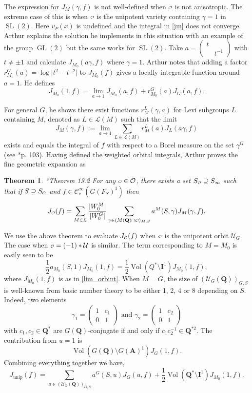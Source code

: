 \documentclass[11pt]{amsart}
\def\A{\mathbf A}
\def\I{\mathbf I}
\def\Q{\mathbf Q}
\def\CCC{\mathcal C}
\def\LLL{\mathcal L}
\def\O{\mathcal O}
\def\o{\scalebox{0.8}{$\scriptstyle\mathcal{O}$}}
\def\UUU{\mathcal U}
\def\cb#1{{\color{blue}#1}}
\def\bs{\setminus} 			%
\def\gl{\operatorname{GL}}
\def\mod#1{\lvert #1 \rvert} %
\def\sl{\operatorname{SL}}
\def\vol{\operatorname{Vol}}
\newtheorem{theorem}{Theorem}[section]
\theoremstyle{remark}
\begin{document}
The expression for $J_M(\gamma, f)$ is not well-defined when $\o$ is not anisotropic. The extreme case of this is when $\o$ is the unipotent variety containing $\gamma = 1$ in $\sl(2)$. Here $v_P(x)$ is undefined and the integral in \cref{jm} does not converge. Arthur explains the solution he implements in this situation with an example of the group $\gl(2)$ but the same works for $\sl(2)$. \cb{Take $a = \begin{pmatrix} t & \\ & t^{-1} \end{pmatrix}$ with $t \neq \pm 1$ and calculate $J_{M_0}(a\gamma, f)$ where $\gamma = 1$. Arthur notes that adding a factor $r_{M_0}^G(a) = \log \mod{t^2 - t^{-2}}$ to $J_{M_0}(f)$ gives a locally integrable function around $a=1$. He defines
\begin{equation} \label{lim_orbint}
	J_{M_0}(1, f) = \lim_{a \to 1} J_{M_0}(a, f) + r_{M_0}^G(a) J_G(a, f).
\end{equation}
}

For general $G$, he shows there exist functions $r_M^L(\gamma, a)$ for Levi subgroups $L$ containing $M$, denoted as $L \in \LLL(M)$ such that the limit
\[ J_M(\gamma, f) := \lim_{a \to 1} \sum_{L \in \LLL(M)} r_M^L(a) J_L(a\gamma, f) \]
exists and equals the integral of $f$ with respect to a Borel measure on the set $\gamma^G$ (see \cite{clay}*{p. 103}). Having defined the weighted orbital integrals, Arthur proves the fine geometric expansion as
\begin{theorem} \cite{clay}*{Theorem 19.2}
	For any $\o \in \O$, there exists a set $S_{\o} \supseteq S_\infty$ such that if $S \supseteq S_{\o}$ and $f \in \CCC_c^\infty(G(F_S)^1)$ then
	\[ J_{\o}(f) = \sum_{M \in \LLL} \frac{\mod{W_0^M}}{\mod{W_0^G}} \sum_{\gamma \in (M(\Q)\cap \o)_{M, S}}
			a^M(S, \gamma) J_M(\gamma, f). \]
\end{theorem}

\cb{We use the above theorem to evaluate $J_{\o}(f)$ when $\o$ is the unipotent orbit $\UUU_G$. The case when $\o = (-1)*\UUU$ is similar. The term corresponding to $M=M_0$ is easily seen to be 
\[ \frac{1}{2} a_{M_0}(S, 1) J_{M_0}(1, f) = \frac{1}{2} \vol(Q^*\bs \I^1) J_{M_0}(1, f), \]
where $J_{M_0}(1, f)$ is as in \cref{lim_orbint}. When $M=G$, the size of $(\UUU_G(\Q))_{G, S}$ is well-known from basic number theory to be either 1, 2, 4 or 8 depending on $S$. Indeed, two elements
\[ \gamma_1 = \begin{pmatrix} 1 & c_1 \\ 0 & 1 \end{pmatrix} \text{ and } \gamma_2 = \begin{pmatrix} 1 & c_2 \\ 0 & 1 \end{pmatrix}
\]
with $c_1, c_2 \in \Q^*$ are $G(\Q)$-conjugate if and only if $c_1 c_2^{-1} \in \Q^{*2}$. The contribution from $u=1$ is 
\[ \vol(G(\Q)\bs G(\A)^1) J_G(1, f). \]
Combining everything together we have, 
\[ J_{\text{unip}}(f) = \sum_{u \in (\UUU_G(\Q))_{G, S}} a^G(S, u) J_G(u, f) + \frac{1}{2} \vol(\Q^*\bs \I^1) J_{M_0}(1, f). \]
}
\end{document}
